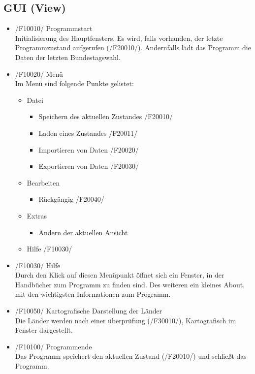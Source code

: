 \documentclass[10pt,a4paper]{article}
\begin{document}
\subsection{GUI (View)}
\begin{itemize}
	\item /F10010/ Programmstart \hfill \\
	Initialisierung des Hauptfensters. Es wird, falls vorhanden, der letzte Programmzustand aufgerufen (/F20010/). Andernfalls lädt das Programm die Daten der letzten Bundestagswahl.
	\item /F10020/ Menü \hfill \\
	Im Menü sind folgende Punkte gelistet:
	\begin{itemize}
		\item Datei
		\begin{itemize}
			\item Speichern des aktuellen Zustandes /F20010/
			\item Laden eines Zustandes /F20011/
			\item Importieren von Daten /F20020/
			\item Exportieren von Daten /F20030/
		\end{itemize}
		\item Bearbeiten
		\begin{itemize}
			\item Rückgängig /F20040/
		\end{itemize}
		\item Extras
		\begin{itemize}
			\item Ändern der aktuellen Ansicht
		\end{itemize}
		\item Hilfe /F10030/
	\end{itemize}
	\item /F10030/ Hilfe \hfill \\
	Durch den Klick auf diesen Menüpunkt öffnet sich ein Fenster, in der Handbücher zum Programm zu finden sind. Des weiteren ein kleines About, mit den wichtigsten Informationen zum Programm.
	\item /F10050/ Kartografische Darstellung der Länder \hfill \\
	Die Länder werden nach einer überprüfung (/F30010/), Kartografisch im Fenster dargestellt.
	\item /F10100/ Programmende \hfill \\
	Das Programm speichert den aktuellen Zustand (/F20010/) und schließt das Programm.
\end{itemize}
\end{document}

